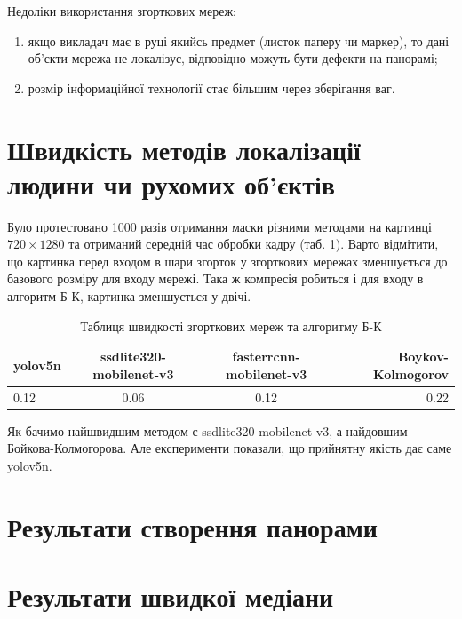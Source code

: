 Недоліки використання згорткових мереж:
\begin{enumerate}
    \item якщо викладач має в руці якийсь предмет (листок паперу чи маркер), то дані
          об'єкти мережа не локалізує, відповідно можуть бути дефекти на панорамі;
    \item розмір інформаційної технології стає більшим через зберігання ваг.
\end{enumerate}

\section{Швидкість методів локалізації людини чи рухомих об'єктів}

Було протестовано 1000 разів отримання маски різними методами на картинці $720 \times 1280$ та
отриманий середній час обробки кадру (таб. \ref{tab:speed_methods_table}).
Варто відмітити, що картинка перед входом в шари згорток у згорткових мережах зменшується
до базового розміру для входу мережі. Така ж компресія робиться і для входу
в алгоритм Б-К, картинка зменшується у двічі.

\begin{table}[H]
    \begin{center}
        \caption{Таблиця швидкості згорткових мереж та алгоритму Б-К}
        \label{tab:speed_methods_table}
        \begin{tabular}{l|c|c|r}
            \textbf{yolov5n} & \textbf{ssdlite320-mobilenet-v3} & \textbf{fasterrcnn-mobilenet-v3} & \textbf{Boykov-Kolmogorov} \\
            \hline
            0.12             & 0.06                             & 0.12                             & 0.22                       \\
        \end{tabular}
    \end{center}
\end{table}


Як бачимо найшвидшим методом є ssdlite320-mobilenet-v3, а найдовшим Бойкова-Колмогорова.
Але експерименти показали, що прийнятну якість дає саме yolov5n.

\section{Результати створення панорами}


\section{Результати швидкої медіани}

